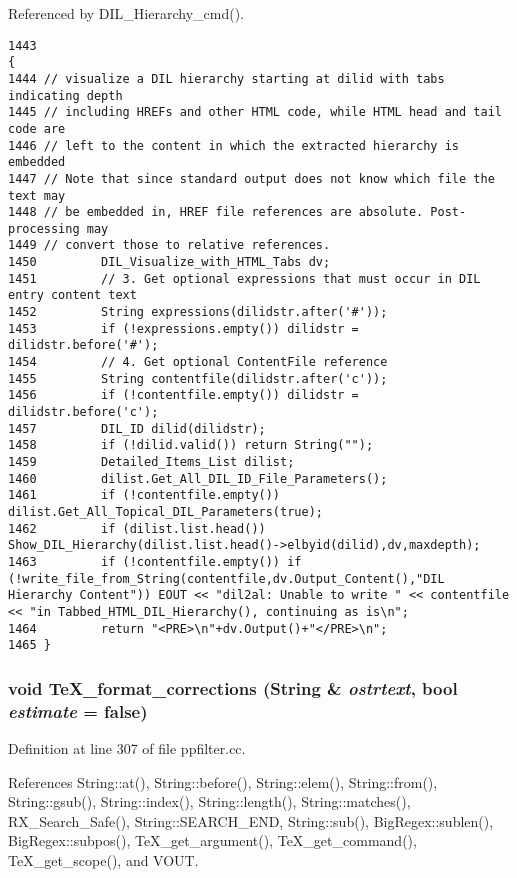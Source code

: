 Referenced by DIL\_\-Hierarchy\_\-cmd().



\footnotesize\begin{verbatim}1443                                                                      {
1444 // visualize a DIL hierarchy starting at dilid with tabs indicating depth
1445 // including HREFs and other HTML code, while HTML head and tail code are
1446 // left to the content in which the extracted hierarchy is embedded
1447 // Note that since standard output does not know which file the text may
1448 // be embedded in, HREF file references are absolute. Post-processing may
1449 // convert those to relative references.
1450         DIL_Visualize_with_HTML_Tabs dv;
1451         // 3. Get optional expressions that must occur in DIL entry content text
1452         String expressions(dilidstr.after('#'));
1453         if (!expressions.empty()) dilidstr = dilidstr.before('#');
1454         // 4. Get optional ContentFile reference
1455         String contentfile(dilidstr.after('c'));
1456         if (!contentfile.empty()) dilidstr = dilidstr.before('c');
1457         DIL_ID dilid(dilidstr);
1458         if (!dilid.valid()) return String("");
1459         Detailed_Items_List dilist;
1460         dilist.Get_All_DIL_ID_File_Parameters();
1461         if (!contentfile.empty()) dilist.Get_All_Topical_DIL_Parameters(true);
1462         if (dilist.list.head()) Show_DIL_Hierarchy(dilist.list.head()->elbyid(dilid),dv,maxdepth);
1463         if (!contentfile.empty()) if (!write_file_from_String(contentfile,dv.Output_Content(),"DIL Hierarchy Content")) EOUT << "dil2al: Unable to write " << contentfile << "in Tabbed_HTML_DIL_Hierarchy(), continuing as is\n";
1464         return "<PRE>\n"+dv.Output()+"</PRE>\n";
1465 }
\end{verbatim}\normalsize 
{}
\subsubsection{\setlength{\rightskip}{0pt plus 5cm}void Te\-X\_\-format\_\-corrections ({\bf String} \& {\em ostrtext}, bool {\em estimate} = {\bf false})}\label{dil2al_8hh_a354}




Definition at line 307 of file ppfilter.cc.

References String::at(), String::before(), String::elem(), String::from(), String::gsub(), String::index(), String::length(), String::matches(), RX\_\-Search\_\-Safe(), String::SEARCH\_\-END, String::sub(), Big\-Regex::sublen(), Big\-Regex::subpos(), Te\-X\_\-get\_\-argument(), Te\-X\_\-get\_\-command(), Te\-X\_\-get\_\-scope(), and VOUT.

